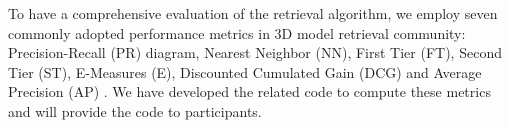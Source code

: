 \documentclass[../main.tex]{subfiles}
\begin{document}
To have a comprehensive evaluation of the retrieval algorithm, we employ seven commonly adopted performance metrics in 3D model retrieval community: Precision-Recall (PR) diagram, Nearest Neighbor (NN), First Tier (FT), Second Tier (ST), E-Measures (E), Discounted Cumulated Gain (DCG) and Average Precision (AP) \cite{CIVU}. We have developed the related code to compute these metrics and will provide the code to participants. 
\end{document}
